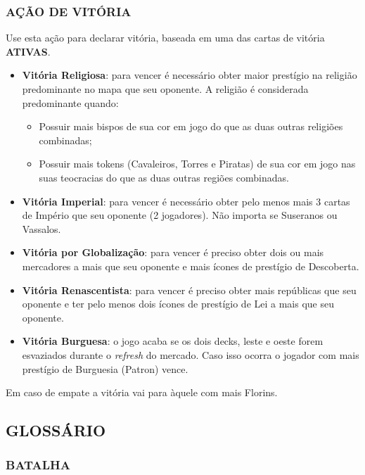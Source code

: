 \documentclass[11pt]{article}
\begin{document}
\subsubsection{AÇÃO DE VITÓRIA}
\label{sec:org1284833}

Use esta ação para declarar vitória, baseada em uma das cartas de vitória \textbf{ATIVAS}.

\begin{itemize}
\item \textbf{Vitória Religiosa}: para vencer é necessário obter maior prestígio na religião predominante no mapa que seu oponente. A religião é considerada predominante quando:
\begin{itemize}
\item Possuir mais bispos de sua cor em jogo do que as duas outras religiões combinadas;
\item Possuir mais tokens (Cavaleiros, Torres e Piratas) de sua cor em jogo nas suas teocracias do que as duas outras regiões combinadas.
\end{itemize}

\item \textbf{Vitória Imperial}: para vencer é necessário obter pelo menos mais 3 cartas de Império que seu oponente (2 jogadores). Não importa se Suseranos ou Vassalos.

\item \textbf{Vitória por Globalização}: para vencer é preciso obter dois ou mais mercadores a mais que seu oponente e mais ícones de prestígio de Descoberta.

\item \textbf{Vitória Renascentista}: para vencer é preciso obter mais repúblicas que seu oponente e ter pelo menos dois ícones de prestígio de Lei a mais que seu oponente.

\item \textbf{Vitória Burguesa}: o jogo acaba se os dois decks, leste e oeste forem esvaziados durante o \emph{refresh} do mercado. Caso isso ocorra o jogador com mais prestígio de Burguesia (Patron) vence.
\end{itemize}
Em caso de empate a vitória vai para àquele com mais Florins.


\subsection{GLOSSÁRIO}
\label{sec:orgd66b3f6}

\subsubsection{BATALHA}
\label{sec:org7a7a144}
\end{document}

